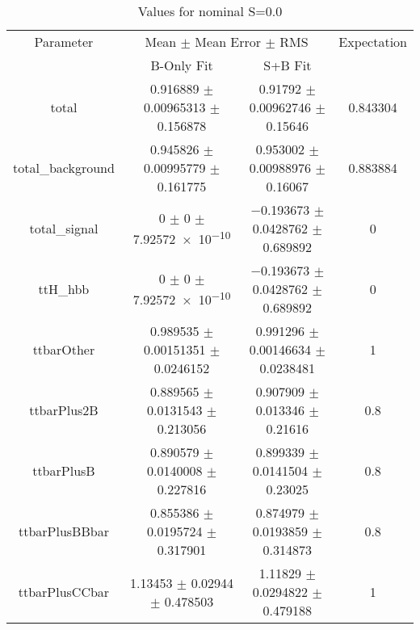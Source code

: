 \begin{table}
\centering
\caption{Values for nominal S=0.0}
\begin{tabular}{cccc}
\toprule
Parameter & \multicolumn{2}{c}{Mean $\pm$ Mean Error $\pm$ RMS} & Expectation\\
 & B-Only Fit & S+B Fit & \\
\midrule
total & \num{0.916889} $\pm$ \num{0.00965313} $\pm$ \num{0.156878} & \num{0.91792} $\pm$ \num{0.00962746} $\pm$ \num{0.15646} & \num{0.843304}\\
total\_background & \num{0.945826} $\pm$ \num{0.00995779} $\pm$ \num{0.161775} & \num{0.953002} $\pm$ \num{0.00988976} $\pm$ \num{0.16067} & \num{0.883884}\\
total\_signal & \num{0} $\pm$ \num{0} $\pm$ \num{7.92572e-10} & \num{-0.193673} $\pm$ \num{0.0428762} $\pm$ \num{0.689892} & \num{0}\\
ttH\_hbb & \num{0} $\pm$ \num{0} $\pm$ \num{7.92572e-10} & \num{-0.193673} $\pm$ \num{0.0428762} $\pm$ \num{0.689892} & \num{0}\\
ttbarOther & \num{0.989535} $\pm$ \num{0.00151351} $\pm$ \num{0.0246152} & \num{0.991296} $\pm$ \num{0.00146634} $\pm$ \num{0.0238481} & \num{1}\\
ttbarPlus2B & \num{0.889565} $\pm$ \num{0.0131543} $\pm$ \num{0.213056} & \num{0.907909} $\pm$ \num{0.013346} $\pm$ \num{0.21616} & \num{0.8}\\
ttbarPlusB & \num{0.890579} $\pm$ \num{0.0140008} $\pm$ \num{0.227816} & \num{0.899339} $\pm$ \num{0.0141504} $\pm$ \num{0.23025} & \num{0.8}\\
ttbarPlusBBbar & \num{0.855386} $\pm$ \num{0.0195724} $\pm$ \num{0.317901} & \num{0.874979} $\pm$ \num{0.0193859} $\pm$ \num{0.314873} & \num{0.8}\\
ttbarPlusCCbar & \num{1.13453} $\pm$ \num{0.02944} $\pm$ \num{0.478503} & \num{1.11829} $\pm$ \num{0.0294822} $\pm$ \num{0.479188} & \num{1}\\
\bottomrule
\end{tabular}
\end{table}